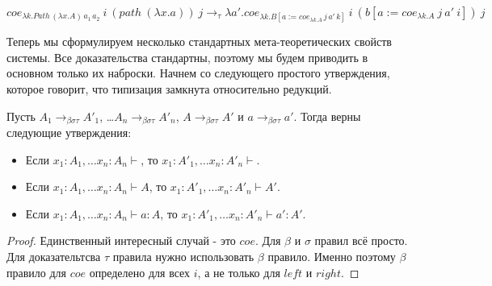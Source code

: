 \documentclass{amsart}
\theoremstyle{definition}
\theoremstyle{remark}
\newcommand{\bs}{\beta\sigma}
\newcommand{\bst}{\bs\tau}
\newcommand{\rbst}{\to_{\bst}}
\numberwithin{figure}{section}
\begin{document}
\[ coe_{\lambda k. Path\,(\lambda x. A)\,a_1\,a_2}\ i\ (path\ (\lambda x. a))\ j \to_\tau \lambda a'. coe_{\lambda k. B[a := coe_{\lambda k. A}\,j\,a'\,k]}\ i\ (b[a := coe_{\lambda k. A}\ j\ a'\ i])\ j \]

Теперь мы сформулируем несколько стандартных мета-теоретических свойств системы.
Все доказательства стандартны, поэтому мы будем приводить в основном только их наброски.
Начнем со следующего простого утверждения, которое говорит, что типизация замкнута относительно редукций.
\begin{prop}
Пусть $A_1 \rbst A'_1$, \ldots $A_n \rbst A'_n$, $A \rbst A'$ и $a \rbst a'$.
Тогда верны следующие утверждения:
\begin{itemize}
\item Если $x_1 : A_1, \ldots x_n : A_n \vdash$, то $x_1 : A'_1, \ldots x_n : A'_n \vdash$.
\item Если $x_1 : A_1, \ldots x_n : A_n \vdash A$, то $x_1 : A'_1, \ldots x_n : A'_n \vdash A'$.
\item Если $x_1 : A_1, \ldots x_n : A_n \vdash a : A$, то $x_1 : A'_1, \ldots x_n : A'_n \vdash a' : A'$.
\end{itemize}
\end{prop}
\begin{proof}
Единственный интересный случай - это $coe$.
Для $\beta$ и $\sigma$ правил всё просто.
Для доказательтсва $\tau$ правила нужно использовать $\beta$ правило.
Именно поэтому $\beta$ правило для $coe$ определено для всех $i$, а не только для $left$ и $right$.
\end{proof}
\end{document}
